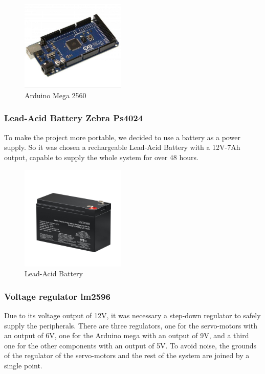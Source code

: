 \documentclass[a4paper,11pt]{article}
\begin{document}
\begin{figure}[H]
  \centering
  \includegraphics[width=5cm]{Figures/arduinoMega.jpg}
  \caption{\small{Arduino Mega 2560}}
  \label{fig:Arduino}
\end{figure}

\subsubsection{Lead-Acid Battery Zebra Ps4024}
To make the project more portable, we decided to use a battery as a power supply. So it was chosen a rechargeable Lead-Acid Battery with a 12V-7Ah output, capable to supply the whole system for over 48 hours.

\begin{figure}[H]
  \centering
  \includegraphics[width=5cm]{Figures/WDC_Bateria_VRLA_9AH_12V_1200Wx1200H.jpg}
  \caption{\small{Lead-Acid Battery}}
  \label{fig:Battery}
\end{figure}

\subsubsection{Voltage regulator lm2596}
Due to its voltage output of 12V, it was necessary a step-down regulator to safely supply the peripherals. There are three regulators, one for the servo-motors with an output of 6V, one for the Arduino mega with an output of 9V, and a third one for the other components with an output of 5V. To avoid noise, the grounds of the regulator of the servo-motors and the rest of the system are joined by a single point.
\end{document}
